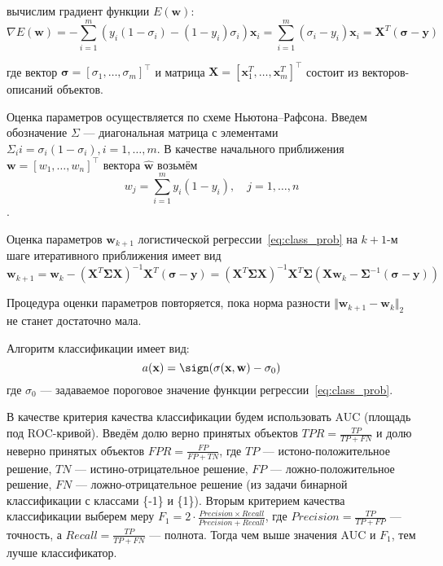 \documentclass[12pt, twoside]{article}
\begin{document}
вычислим градиент функции $E(\textbf{w})$:
$$\nabla E(\textbf{w}) = - \sum_{i=1}^{m} (y_i(1 - \sigma_i) - (1 - y_i) \sigma_i) \textbf{x}_i = \sum_{i=1}^{m} (\sigma_i - y_i) \textbf{x}_i =  \textbf{X}^T (\bm{\sigma} - \textbf{y})$$

где вектор $\bm{\sigma} = [\sigma_1, \dots, \sigma_m]^\top$ и матрица $\textbf{X} = [\textbf{x}_1^T, \dots, \textbf{x}_m^T]^\top$ состоит из векторов-описаний объектов.

Оценка параметров осуществляется по схеме Ньютона--Рафсона. Введем обозначение $\Sigma$ --- диагональная матрица с элементами $\Sigma_ii = \sigma_i (1 - \sigma_i), i = 1, \dots, m$. В качестве начального приближения $\textbf{w} = [w_1, \dots, w_n]^\top$ вектора $\hat{\textbf{w}}$ возьмём
$$w_j = \sum_{i=1}^{m} y_i (1 - y_i), \quad j = 1, \dots, n$$.

Оценка параметров $\textbf{w}_{k+1}$ логистической регрессии~\eqref{eq:class_prob} на $k + 1$-м шаге итеративного приближения имеет вид
\begin{equation}
\textbf{w}_{k+1} = \textbf{w}_k - (\textbf{X}^T \bm{\Sigma} \textbf{X})^{-1} \textbf{X}^T (\bm{\sigma} - \textbf{y}) = (\textbf{X}^T \bm{\Sigma} \textbf{X})^{-1} \textbf{X}^T \bm{\Sigma} (\textbf{X} \textbf{w}_k - \bm{\Sigma}^{-1} (\bm{\sigma} - \textbf{y}))
\end{equation}

Процедура оценки параметров повторяется, пока норма разности $\Vert \textbf{w}_{k+1} - \textbf{w}_k \Vert_{2}$ не станет достаточно мала.

Алгоритм классификации имеет вид:
\begin{equation}
a(\textbf{x}) = \sign (\sigma (\textbf{x}, \textbf{w}) - \sigma_0)
\end{equation}
где $\sigma_0$ --- задаваемое пороговое значение функции регрессии~\eqref{eq:class_prob}.

В качестве критерия качества классификации будем использовать AUC (площадь под ROC-кривой). Введём долю верно принятых объектов $TPR = \frac{TP}{TP + FN}$ и долю неверно принятых объектов $FPR = \frac{FP}{FP + TN}$, где $TP$ --- истоно-положительное решение, $TN$ --- истино-отрицательное решение, $FP$ --- ложно-положительное решение, $FN$ --- ложно-отрицательное решение	(из задачи бинарной классификации с классами \{-1\} и \{1\}). Вторым критерием качества классификации выберем меру $F_1 = 2 \cdot \frac{Precision \times Recall}{Precision + Recall}$, где $Precision = \frac{TP}{TP + FP}$ --- точность, а $Recall = \frac{TP}{TP + FN}$ --- полнота. Тогда чем выше значения AUC и $F_1$, тем лучше классификатор.
\end{document}
